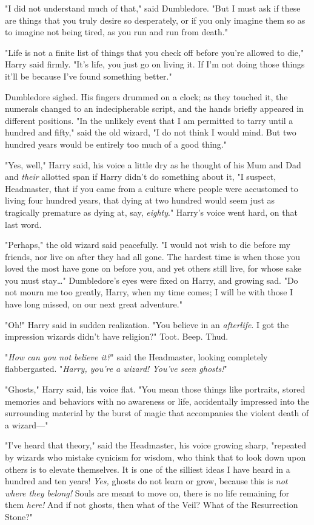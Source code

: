 "I did not understand much of that," said Dumbledore. "But I must ask if these
are things that you truly desire so desperately, or if you only imagine them so
as to imagine not being tired, as you run and run from death."

"Life is not a finite list of things that you check off before you're allowed
to die," Harry said firmly. "It's life, you just go on living it. If I'm not
doing those things it'll be because I've found something better."

Dumbledore sighed. His fingers drummed on a clock; as they touched it, the
numerals changed to an indecipherable script, and the hands briefly appeared in
different positions. "In the unlikely event that I am permitted to tarry until
a hundred and fifty," said the old wizard, "I do not think I would mind. But
two hundred years would be entirely too much of a good thing."

"Yes, well," Harry said, his voice a little dry as he thought of his Mum and
Dad and \emph{their} allotted span if Harry didn't do something about it, "I
suspect, Headmaster, that if you came from a culture where people were
accustomed to living four hundred years, that dying at two hundred would seem
just as tragically premature as dying at, say, \emph{eighty}." Harry's voice
went hard, on that last word.

"Perhaps," the old wizard said peacefully. "I would not wish to die before my
friends, nor live on after they had all gone. The hardest time is when those
you loved the most have gone on before you, and yet others still live, for
whose sake you must stay{\ldots}" Dumbledore's eyes were fixed on Harry, and
growing sad. "Do not mourn me too greatly, Harry, when my time comes; I will be
with those I have long missed, on our next great adventure."

"Oh!" Harry said in sudden realization. "You believe in an \emph{afterlife}. I
got the impression wizards didn't have religion?"
\later
Toot. Beep. Thud.

"\emph{How can you not believe it?}" said the Headmaster, looking completely
flabbergasted. "\emph{Harry, you're a wizard! You've seen ghosts!}"

"Ghosts," Harry said, his voice flat. "You mean those things like portraits,
stored memories and behaviors with no awareness or life, accidentally impressed
into the surrounding material by the burst of magic that accompanies the
violent death of a wizard---"

"I've heard that theory," said the Headmaster, his voice growing sharp,
"repeated by wizards who mistake cynicism for wisdom, who think that to look
down upon others is to elevate themselves. It is one of the silliest ideas I
have heard in a hundred and ten years! \emph{Yes,} ghosts do not learn or grow,
because this is \emph{not where they belong!} Souls are meant to move on, there
is no life remaining for them \emph{here!} And if not ghosts, then what of the
Veil? What of the Resurrection Stone?"

